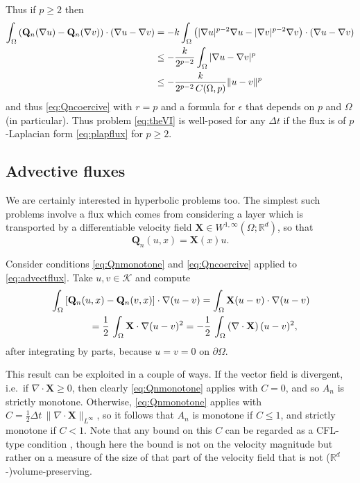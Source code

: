 \documentclass[final,leqno,onefignum,onetabnum]{siamltex1213bueler}
\newcommand\bQ{\mathbf{Q}}
\newcommand\bX{\mathbf{X}}
\newcommand{\Div}{\nabla\cdot}
\newcommand\eps{\epsilon}
\renewcommand{\grad}{\nabla}
\newcommand\RR{\mathbb{R}}
\begin{document}
Thus if $p\ge 2$ then
\begin{align}
\int_\Omega \left(\bQ_n(\grad u) - \bQ_n(\grad v)\right)\cdot (\grad u - \grad v) &= -k  \int_\Omega \left(|\grad u|^{p-2} \grad u - |\grad v|^{p-2} \grad v\right)\cdot (\grad u - \grad v) \notag \\
  &\le - \frac{k}{2^{p-2}} \int_\Omega |\grad u - \grad v|^p \notag \\
  &\le - \frac{k}{2^{p-2}\,C(\Omega,p)} \|u-v\|^p \label{eq:plapQnmono}
\end{align}
and thus \eqref{eq:Qncoercive} with $r=p$ and a formula for $\eps$ that depends on $p$ and $\Omega$ (in particular).  Thus problem \eqref{eq:theVI} is well-posed for any $\Delta t$ if the flux is of $p$-Laplacian form \eqref{eq:plapflux} for $p\ge 2$.

\subsection{Advective fluxes} \label{subsec:advect}  We are certainly interested in hyperbolic problems too.  The simplest such problems involve a flux which comes from considering a layer which is transported by a differentiable velocity field $\bX \in W^{1,\infty}(\Omega;\RR^d)$, so that
\begin{equation}
  \bQ_n(u,x) = \bX(x) u. \label{eq:advectflux}
\end{equation}

Consider conditions \eqref{eq:Qnmonotone} and \eqref{eq:Qncoercive} applied to \eqref{eq:advectflux}.  Take $u,v\in\mathcal{K}$ and compute
\begin{align}
   &\int_\Omega \left[\bQ_n(u,x) - \bQ_n(v,x)\right] \cdot \grad (u - v) = \int_\Omega \bX (u-v) \cdot \grad (u - v)   \label{eq:advectQnmono} \\
   &\qquad\qquad = \frac{1}{2}\,\int_\Omega \bX \cdot \grad (u - v)^2 = - \frac{1}{2}\,\int_\Omega \left(\Div\bX\right) (u - v)^2, \notag
\end{align}
after integrating by parts, because $u=v=0$ on $\partial \Omega$.

This result can be exploited in a couple of ways.  If the vector field is divergent, i.e.~if $\Div\bX\ge 0$, then clearly \eqref{eq:Qnmonotone} applies with $C=0$, and so $A_n$ is strictly monotone.  Otherwise, \eqref{eq:Qnmonotone} applies with $C = \frac{1}{2}\Delta t\,\|\Div\bX\|_{L^\infty}$, so it follows that $A_n$ is monotone if $C\le 1$, and strictly monotone if $C<1$.  Note that any bound on this $C$ can be regarded as a CFL-type condition \cite{LeVeque}, though here the bound is not on the velocity magnitude but rather on a measure of the size of that part of the velocity field that is not ($\RR^d$-)volume-preserving.
\end{document}
